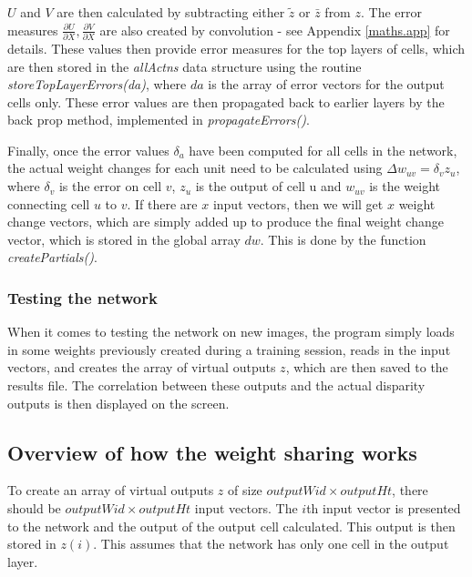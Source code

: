 \documentclass[a4paper]{article}
\newcommand{\zbar}{\bar{z}}
\newcommand{\ztilde}{\tilde{z}}
\newcommand{\pdiff}[2]{ \frac{\partial #1}{\partial #2}}
\begin{document}
$U$ and $V$ are then calculated by subtracting either $\ztilde$ or
$\zbar$ from $z$.  The error measures $\pdiff{U}{X}, \pdiff{V}{X}$ are
also created by convolution - see Appendix \ref{maths.app} for
details.  These values then provide error measures for the top layers
of cells, which are then stored in the {\em allActns} data structure
using the routine {\em storeTopLayerErrors(da)}, where $da$ is the
array of error vectors for the output cells only.  These error values
are then propagated back to earlier layers by the back prop method,
implemented in {\em propagateErrors()}.

Finally, once the error values $\delta_a$ have been computed for all
cells in the network, the actual weight changes for each unit need to
be calculated using $\Delta w_{uv} = \delta_v z_u$, where $\delta_v$
is the error on cell $v$, $z_u$ is the output of cell u and $w_{uv}$ is
the weight connecting cell $u$ to $v$.  If there are $x$ input
vectors, then we will get $x$ weight change vectors, which are simply
added up to produce the final weight change vector, which is stored in
the global array $dw$.  This is done by the function {\em createPartials()}.

\subsubsection{Testing the network}

When it comes to testing the network on new images, the program simply
loads in some weights previously created during a training session,
reads in the input vectors, and creates the array of virtual outputs
$z$, which are then saved to the results file.  The correlation
between these outputs and the actual disparity outputs is then
displayed on the screen.

\subsection{Overview of how the weight sharing  works}

To create an array of virtual outputs $z$ of size $outputWid \times
outputHt$, there should be $outputWid \times outputHt$ input vectors.
The $i$th input vector is presented to the network and the output of the
output cell calculated.  This output is then stored in $z(i)$.  This
assumes that the network has only one cell in the output layer.
\end{document}
